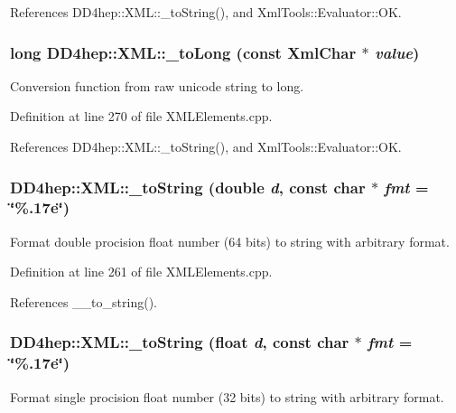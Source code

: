 References DD4hep::XML::\_\-toString(), and XmlTools::Evaluator::OK.\hypertarget{group___d_d4_h_e_p___x_m_l_ga0da6cdd75009487075f485c74a034a7b}{
\subsubsection[{\_\-toLong}]{\setlength{\rightskip}{0pt plus 5cm}long DD4hep::XML::\_\-toLong (const XmlChar $\ast$ {\em value})}}
\label{group___d_d4_h_e_p___x_m_l_ga0da6cdd75009487075f485c74a034a7b}


Conversion function from raw unicode string to long. 

Definition at line 270 of file XMLElements.cpp.

References DD4hep::XML::\_\-toString(), and XmlTools::Evaluator::OK.\hypertarget{group___d_d4_h_e_p___x_m_l_ga101954caf40eafb6b0bc58223764a3d4}{
\subsubsection[{\_\-toString}]{ DD4hep::XML::\_\-toString (double {\em d}, \/  const char $\ast$ {\em fmt} = {\ttfamily \char`\"{}\%.17e\char`\"{}})}}
\label{group___d_d4_h_e_p___x_m_l_ga101954caf40eafb6b0bc58223764a3d4}


Format double procision float number (64 bits) to string with arbitrary format. 

Definition at line 261 of file XMLElements.cpp.

References \_\-\_\-to\_\-string().\hypertarget{group___d_d4_h_e_p___x_m_l_ga5fe476c5280899829d9defb4386524a9}{
\subsubsection[{\_\-toString}]{ DD4hep::XML::\_\-toString (float {\em d}, \/  const char $\ast$ {\em fmt} = {\ttfamily \char`\"{}\%.17e\char`\"{}})}}
\label{group___d_d4_h_e_p___x_m_l_ga5fe476c5280899829d9defb4386524a9}


Format single procision float number (32 bits) to string with arbitrary format. 


